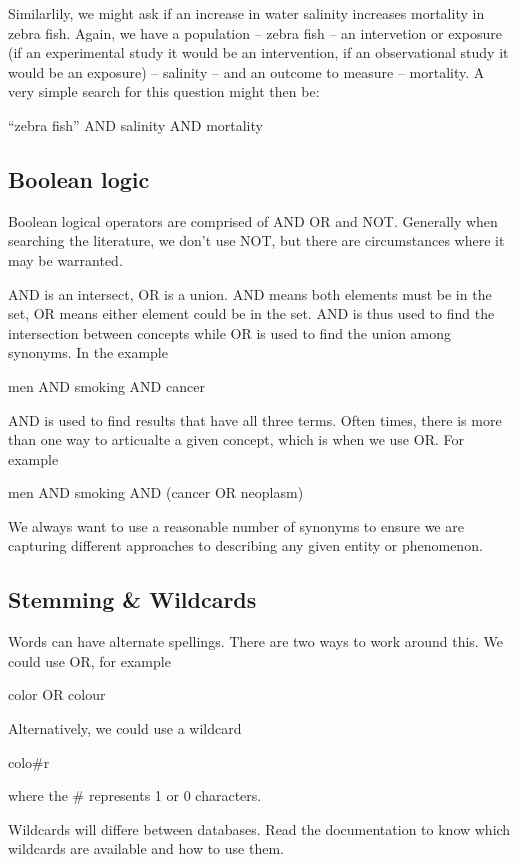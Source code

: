 \documentclass[
]{book}
\begin{document}
Similarlily, we might ask if an increase in water salinity increases mortality in zebra fish. Again, we have a population -- zebra fish -- an intervetion or exposure (if an experimental study it would be an intervention, if an observational study it would be an exposure) -- salinity -- and an outcome to measure -- mortality. A very simple search for this question might then be:

``zebra fish'' AND salinity AND mortality

\subsection{Boolean logic}\label{boolean-logic}

Boolean logical operators are comprised of AND OR and NOT. Generally when searching the literature, we don't use NOT, but there are circumstances where it may be warranted.

AND is an intersect, OR is a union. AND means both elements must be in the set, OR means either element could be in the set. AND is thus used to find the intersection between concepts while OR is used to find the union among synonyms. In the example

men AND smoking AND cancer

AND is used to find results that have all three terms. Often times, there is more than one way to articualte a given concept, which is when we use OR. For example

men AND smoking AND (cancer OR neoplasm)

We always want to use a reasonable number of synonyms to ensure we are capturing different approaches to describing any given entity or phenomenon.

\subsection{Stemming \& Wildcards}\label{stemming-wildcards}

Words can have alternate spellings. There are two ways to work around this. We could use OR, for example

color OR colour

Alternatively, we could use a wildcard

colo\#r

where the \# represents 1 or 0 characters.

Wildcards will differe between databases. Read the documentation to know which wildcards are available and how to use them.
\end{document}
